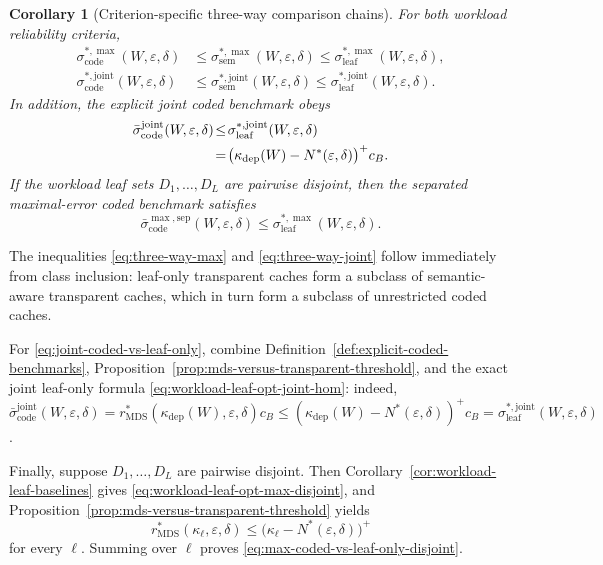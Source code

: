 \documentclass[journal]{IEEEtran}
\makeatletter
\newtheorem{corollary}{Corollary}[section]
\numberwithin{equation}{section}
\renewenvironment{proof}[1][\proofname]{\par
  \pushQED{\qed}%
  \normalfont \topsep6\p@\@plus6\p@\relax
  \trivlist
  \item[\hskip\labelsep
        \itshape
    #1\@addpunct{.}]\ignorespaces
}{%
  \popQED\endtrivlist\@endpefalse
}
\makeatother
\begin{document}
\begin{corollary}[Criterion-specific three-way comparison chains]
\label{cor:coded-transparent-three-way}
For both workload reliability criteria,
\begin{align}
  \sigma_{\mathrm{code}}^{*,\max}
  (W,\varepsilon,\delta)
  &\le
  \sigma_{\mathrm{sem}}^{*,\max}
  (W,\varepsilon,\delta)
  \le
  \sigma_{\mathrm{leaf}}^{*,\max}
  (W,\varepsilon,\delta),
\label{eq:three-way-max}\\
  \sigma_{\mathrm{code}}^{*,\mathrm{joint}}
  (W,\varepsilon,\delta)
  &\le
  \sigma_{\mathrm{sem}}^{*,\mathrm{joint}}
  (W,\varepsilon,\delta)
  \le
  \sigma_{\mathrm{leaf}}^{*,\mathrm{joint}}
  (W,\varepsilon,\delta).
\label{eq:three-way-joint}
\end{align}
In addition, the explicit joint coded benchmark obeys
\begin{align}
  \bar{\sigma}_{\mathrm{code}}^{\mathrm{joint}}
  (W,\varepsilon,\delta)
  &\!\le\!
  \sigma_{\mathrm{leaf}}^{*,\mathrm{joint}}
  (W,\varepsilon,\delta)
  \notag\\
  &\!=\!
  \bigl(
    \kappa_{\mathrm{dep}}(W)-N^*(\varepsilon,\delta)
  \bigr)^+c_B.
\label{eq:joint-coded-vs-leaf-only}
\end{align}
If the workload leaf sets \(D_1,\ldots,D_L\) are pairwise disjoint, then the
separated maximal-error coded benchmark satisfies
\begin{equation}
  \bar{\sigma}_{\mathrm{code}}^{\max,\mathrm{sep}}
  (W,\varepsilon,\delta)
  \le
  \sigma_{\mathrm{leaf}}^{*,\max}
  (W,\varepsilon,\delta).
\label{eq:max-coded-vs-leaf-only-disjoint}
\end{equation}
\end{corollary}

\begin{proof}
The inequalities \eqref{eq:three-way-max} and \eqref{eq:three-way-joint}
follow immediately from class inclusion:
leaf-only transparent caches form a subclass of semantic-aware transparent
caches, which in turn form a subclass of unrestricted coded caches.

For \eqref{eq:joint-coded-vs-leaf-only}, combine
Definition~\ref{def:explicit-coded-benchmarks},
Proposition~\ref{prop:mds-versus-transparent-threshold}, and the exact joint
leaf-only formula \eqref{eq:workload-leaf-opt-joint-hom}: indeed,
\(\bar{\sigma}_{\mathrm{code}}^{\mathrm{joint}}(W,\varepsilon,\delta)
=r_{\mathrm{MDS}}^*(\kappa_{\mathrm{dep}}(W),\varepsilon,\delta)c_B
\le(\kappa_{\mathrm{dep}}(W)-N^*(\varepsilon,\delta))^+c_B
=\sigma_{\mathrm{leaf}}^{*,\mathrm{joint}}(W,\varepsilon,\delta)\).

Finally, suppose \(D_1,\ldots,D_L\) are pairwise disjoint.  Then
Corollary~\ref{cor:workload-leaf-baselines} gives
\eqref{eq:workload-leaf-opt-max-disjoint}, and
Proposition~\ref{prop:mds-versus-transparent-threshold} yields
\[
  r_{\mathrm{MDS}}^*(\kappa_\ell,\varepsilon,\delta)
  \le
  \bigl(\kappa_\ell-N^*(\varepsilon,\delta)\bigr)^+
\]
for every \(\ell\).  Summing over \(\ell\) proves
\eqref{eq:max-coded-vs-leaf-only-disjoint}.
\end{proof}
\end{document}
